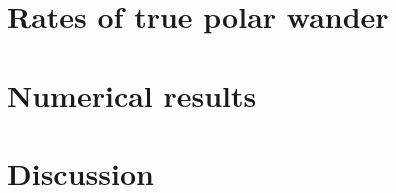 \documentclass{gji}
\begin{document}
\section{Rates of true polar wander}

\section{Numerical results}

\section{Discussion}


\begin{acknowledgments}
\end{acknowledgments}





\label{lastpage}
\end{document}
